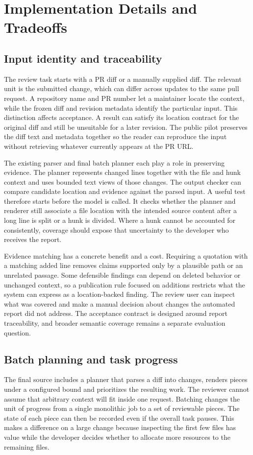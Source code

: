 \documentclass[journal,compsoc]{IEEEtran}
\begin{document}
\section{Implementation Details and Tradeoffs}
\subsection{Input identity and traceability}
The review task starts with a PR diff or a manually supplied diff. The relevant unit is the submitted change, which can differ across updates to the same pull request. A repository name and PR number let a maintainer locate the context, while the frozen diff and revision metadata identify the particular input. This distinction affects acceptance. A result can satisfy its location contract for the original diff and still be unsuitable for a later revision. The public pilot preserves the diff text and metadata together so the reader can reproduce the input without retrieving whatever currently appears at the PR URL.

The existing parser and final batch planner each play a role in preserving evidence. The planner represents changed lines together with the file and hunk context and uses bounded text views of those changes. The output checker can compare candidate location and evidence against the parsed input. A useful test therefore starts before the model is called. It checks whether the planner and renderer still associate a file location with the intended source content after a long line is split or a hunk is divided. Where a hunk cannot be accounted for consistently, coverage should expose that uncertainty to the developer who receives the report.

Evidence matching has a concrete benefit and a cost. Requiring a quotation with a matching added line removes claims supported only by a plausible path or an unrelated passage. Some defensible findings can depend on deleted behavior or unchanged context, so a publication rule focused on additions restricts what the system can express as a location-backed finding. The review user can inspect what was covered and make a manual decision about changes the automated report did not address. The acceptance contract is designed around report traceability, and broader semantic coverage remains a separate evaluation question.

\subsection{Batch planning and task progress}
The final source includes a planner that parses a diff into changes, renders pieces under a configured bound and prioritizes the resulting work. The reviewer cannot assume that arbitrary context will fit inside one request. Batching changes the unit of progress from a single monolithic job to a set of reviewable pieces. The state of each piece can then be recorded even if the overall task pauses. This makes a difference on a large change because inspecting the first few files has value while the developer decides whether to allocate more resources to the remaining files.
\end{document}
